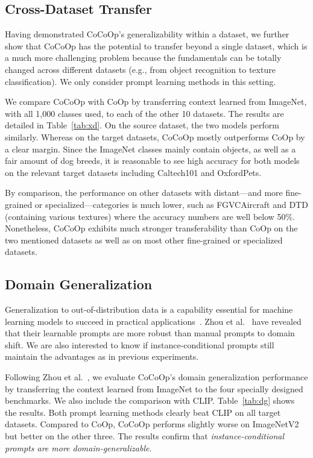 \documentclass[10pt,twocolumn,letterpaper]{article}
\begin{document}
\subsection{Cross-Dataset Transfer}
\label{sec:experiments;subsec:transfer_crossdatasets}

Having demonstrated CoCoOp's generalizability within a dataset, we further show that CoCoOp has the potential to transfer beyond a single dataset, which is a much more challenging problem because the fundamentals can be totally changed across different datasets (e.g., from object recognition to texture classification). We only consider prompt learning methods in this setting.

We compare CoCoOp with CoOp by transferring context learned from ImageNet, with all 1,000 classes used, to each of the other 10 datasets. The results are detailed in Table~\ref{tab:xd}. On the source dataset, the two models perform similarly. Whereas on the target datasets, CoCoOp mostly outperforms CoOp by a clear margin. Since the ImageNet classes mainly contain objects, as well as a fair amount of dog breeds, it is reasonable to see high accuracy for both models on the relevant target datasets including Caltech101 and OxfordPets. 

By comparison, the performance on other datasets with distant---and more fine-grained or specialized---categories is much lower, such as FGVCAircraft and DTD (containing various textures) where the accuracy numbers are well below 50\%. Nonetheless, CoCoOp exhibits much stronger transferability than CoOp on the two mentioned datasets as well as on most other fine-grained or specialized datasets.


\subsection{Domain Generalization}
\label{sec:experiments;subsec:dg}

Generalization to out-of-distribution data is a capability essential for machine learning models to succeed in practical applications~\cite{taori2020measuring,zhou2021domain}. Zhou et al.~\cite{zhou2021coop} have revealed that their learnable prompts are more robust than manual prompts to domain shift. We are also interested to know if instance-conditional prompts still maintain the advantages as in previous experiments.

Following Zhou et al.~\cite{zhou2021coop}, we evaluate CoCoOp's domain generalization performance by transferring the context learned from ImageNet to the four specially designed benchmarks. We also include the comparison with CLIP.
Table~\ref{tab:dg} shows the results. Both prompt learning methods clearly beat CLIP on all target datasets. Compared to CoOp, CoCoOp performs slightly worse on ImageNetV2 but better on the other three. The results confirm that \emph{instance-conditional prompts are more domain-generalizable}.
\end{document}
